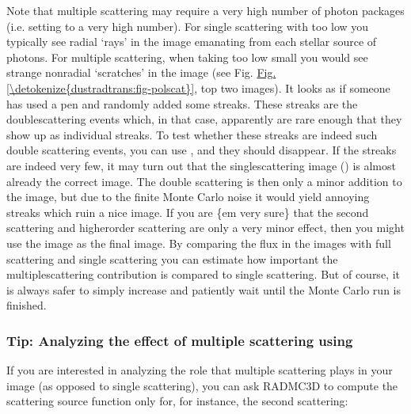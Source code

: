 \documentclass[letterpaper,10pt,english]{sphinxmanual}
\begin{document}
Note that multiple scattering may require a very high number of photon packages
(i.e. setting  to a very high number). For single scattering with
too low  you typically see radial ‘rays’ in the image emanating
from each stellar source of photons. For multiple scattering, when taking too
low  small you would see strange non\sphinxhyphen{}radial ‘scratches’ in the
image (see Fig. \hyperref[\detokenize{dustradtrans:fig-polscat}]{Fig.\@ \ref{\detokenize{dustradtrans:fig-polscat}}}, top two images). It looks as if someone has
used a pen and randomly added some streaks. These streaks are the
double\sphinxhyphen{}scattering events which, in that case, apparently are rare enough that
they show up as individual streaks. To test whether these streaks are indeed
such double scattering events, you can use , and they should
disappear. If the streaks are indeed very few, it may turn out that the
single\sphinxhyphen{}scattering image () is almost already the correct
image. The double scattering is then only a minor addition to the image, but due
to the finite Monte Carlo noise it would yield annoying streaks which ruin a
nice image. If you are \{em very sure\} that the second scattering and
higher\sphinxhyphen{}order scattering are only a very minor effect, then you might use the
 image as the final image. By comparing the flux in the images
with full scattering and single scattering you can estimate how important the
multiple\sphinxhyphen{}scattering contribution is compared to single scattering. But of
course, it is always safer to simply increase  and patiently wait
until the Monte Carlo run is finished.


\subsubsection{Tip: Analyzing the effect of multiple scattering using }
\label{\detokenize{dustradtrans:tip-analyzing-the-effect-of-multiple-scattering-using-selectscat}}\label{\detokenize{dustradtrans:sec-select-scattering}}
If you are interested in analyzing the role that multiple scattering plays in your
image (as opposed to single scattering), you can ask RADMC\sphinxhyphen{}3D to compute the
scattering source function only for, for instance, the second scattering:
\end{document}
